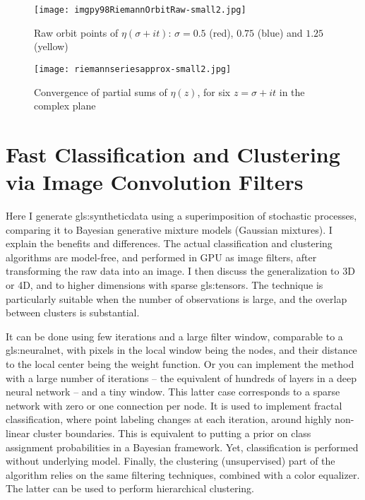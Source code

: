 \documentclass[oneside,10pt]{book}
\newcommand\Chapter[2]{
  \chapter[#1]{#1\\[2ex]\Large\itshape#2}
}
\begin{document}
\begin{figure}[H]
\centering
\texttt{[image: imgpy98RiemannOrbitRaw-small2.jpg]}
\caption{Raw orbit points of $\eta(\sigma + it)$: $\sigma=0.5$ (red), $0.75$ (blue) and $1.25$ (yellow)}
\label{fig:orbit102b}
\end{figure}


\begin{figure}[H]
\centering
\texttt{[image: riemannseriesapprox-small2.jpg]}
\caption{Convergence of partial sums of $\eta(z)$, for six $z=\sigma+it$ in the complex plane}
\label{fig:orbit103}
\end{figure}

\Chapter{Fast Classification and Clustering via Image Convolution Filters}{}\label{chapterfastclassif}

Here I generate \gls{gls:syntheticdata} using a superimposition of stochastic processes, comparing it to Bayesian generative mixture models (Gaussian mixtures). I explain the benefits and differences. The actual classification and clustering algorithms are model-free, and performed in GPU as image filters, after transforming the raw data into an image. I then discuss the generalization to 3D or 4D, and to higher dimensions with sparse \glspl{gls:tensor}. The technique is particularly suitable when the number of observations is large, and the overlap between clusters is substantial.

It can be done using few iterations and a large filter window, comparable to a \gls{gls:neuralnet}, with pixels in the local window being the nodes, and their distance to the local center being the weight function. Or you can implement the method with a large number of iterations -- the equivalent of hundreds of layers in a deep neural network -- and a tiny window. This latter case corresponds to a
\textcolor{index}{sparse network} with zero or one connection per node. It is used to implement fractal classification, where point labeling changes at each iteration, around highly non-linear cluster boundaries. This is equivalent to putting a prior on class assignment probabilities in a Bayesian framework. Yet, classification is performed without underlying model. Finally, the clustering (unsupervised) part of the algorithm relies on the same filtering techniques, combined with a color equalizer. The latter can be used to perform hierarchical clustering.
\end{document}
